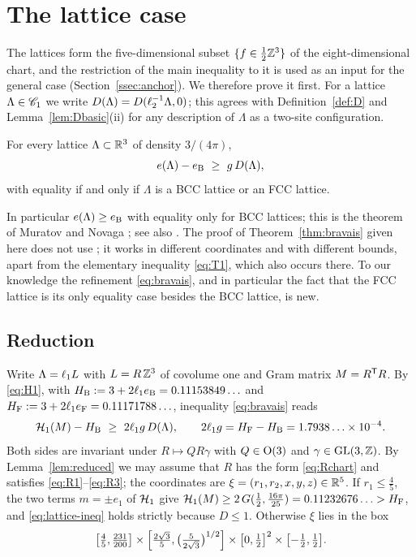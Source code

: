 \section{The lattice case}\label{sec:bravais}

The lattices form the five-dimensional subset $\{f\in\frac12\mathbb Z^3\}$ of the eight-dimensional chart, and the restriction of the main
inequality to it is used as an input for the general case (Section~\ref{ssec:anchor}). We therefore prove it first. For a lattice
$\Lambda\in\mathscr C_1$ we write $D(\Lambda)=D(\ell_2^{-1}\Lambda,0)$; this agrees with Definition~\ref{def:D} and
Lemma~\ref{lem:Dbasic}(ii) for any description of $\Lambda$ as a two-site configuration.

\begin{theorem}\label{thm:bravais}
For every lattice $\Lambda\subset\mathbb R^3$ of density $3/(4\pi)$,
\begin{equation}\label{eq:bravais}
  e(\Lambda)-e_{\mathrm B}\ \ge\ g\,D(\Lambda),
\end{equation}
with equality if and only if $\Lambda$ is a BCC lattice or an FCC lattice.
\end{theorem}

In particular $e(\Lambda)\ge e_{\mathrm B}$ with equality only for BCC lattices; this is the theorem of Muratov and Novaga
\cite{MuratovNovaga2026}; see also \cite{LuoWei2026Yukawa}. The proof of
Theorem~\ref{thm:bravais} given here does not use \cite{MuratovNovaga2026}; it works in different coordinates and with different
bounds, apart from the elementary inequality \eqref{eq:T1}, which also occurs there. To our knowledge the refinement
\eqref{eq:bravais}, and in particular the fact that the FCC lattice is its only equality case besides the BCC lattice, is new.

\subsection{Reduction}

Write $\Lambda=\ell_1 L$ with $L=R\,\mathbb Z^3$ of covolume one and Gram matrix $M=R^\mathsf T R$. By \eqref{eq:H1}, with
$H_\mathrm B:=3+2\ell_1e_{\mathrm B}=0.11153849\ldots$ and $H_\mathrm F:=3+2\ell_1e_{\mathrm F}=0.11171788\ldots$, inequality \eqref{eq:bravais} reads
\begin{equation}\label{eq:lattice-ineq}
  \mathcal H_1(M)-H_\mathrm B\ \ge\ 2\ell_1g\,D(\Lambda),\qquad 2\ell_1g=H_\mathrm F-H_\mathrm B=1.7938\ldots\times10^{-4}.
\end{equation}
Both sides are invariant under $R\mapsto QR\gamma$ with $Q\in\mathrm{O}(3)$ and $\gamma\in\mathrm{GL}(3,\mathbb Z)$. By Lemma~\ref{lem:reduced} we may assume
that $R$ has the form \eqref{eq:Rchart} and satisfies \eqref{eq:R1}--\eqref{eq:R3}; the coordinates are $\xi=(r_1,r_2,x,y,z)\in\mathbb R^5$.
If $r_1\le\frac45$, the two terms $m=\pm e_1$ of $\mathcal H_1$ give
$\mathcal H_1(M)\ge2\,G(\frac12,\frac{16\pi}{25})=0.11232676\ldots>H_\mathrm F$, and \eqref{eq:lattice-ineq} holds strictly because $D\le1$. Otherwise
$\xi$ lies in the box
\begin{equation}\label{eq:root5}
  \bigl[\tfrac45,\tfrac{231}{200}\bigr]\times\Bigl[\tfrac{2\sqrt3}5,\bigl(\tfrac5{2\sqrt3}\bigr)^{1/2}\Bigr]\times\bigl[0,\tfrac12\bigr]^2\times\bigl[-\tfrac12,\tfrac12\bigr].
\end{equation}

